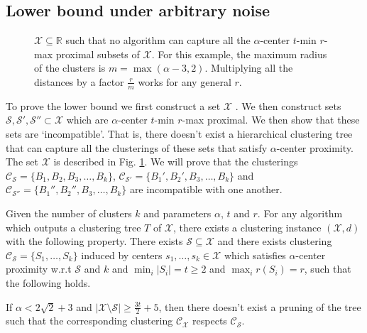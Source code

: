 \documentclass[anon,12pt]{colt2016} %
\newcommand{\mc}{\mathcal}
\begin{document}
\subsection{Lower bound under arbitrary noise}
\label{section:alphaLowerBoundArbitrary}

\begin{figure}

\caption{$\mc X \subseteq \mathbb{R}$ such that no algorithm can capture all the $\alpha$-center $t$-min $r$-max proximal subsets of $\mc X$. For this example, the maximum radius of the clusters is $m = \max(\alpha-3, 2)$. Multiplying all the distances by a factor $\frac{r}{m}$ works for any general $r$.} 
\label{fig:nosparsealg}
\end{figure}

To prove the lower bound we first construct a set $\mc X$ . We then construct sets $\mc S, \mc S', \mc S'' \subset \mc X$ which are $\alpha$-center $t$-min $r$-max proximal. We then show that these sets are `incompatible'. That is, there doesn't exist a  hierarchical clustering tree that can capture all the clusterings of these sets that satisfy $\alpha$-center proximity. The set $\mc X$ is described in Fig. \ref{fig:nosparsealg}. We will prove that the clusterings $\mc C_{\mc S} = \{B_1, B_2, B_3, \ldots, B_k\}$, $\mc C_{\mc S'} = \{B_1', B_2', B_3, \ldots, B_k\}$ and $\mc C_{\mc S''} = \{B_1'', B_2'', B_3, \ldots, B_k\}$ are incompatible with one another.

\begin{theorem}
\label{thm:nosparsealg}
Given the number of clusters $k$ and parameters $\alpha$, $t$ and $r$. For any algorithm which outputs a clustering tree $T$ of $\mc X$, there exists a clustering instance $(\mc X, d)$ with the following property. There exists $\mc S \subseteq \mc X$ and there exists clustering $\mc C_{\mc S} = \{S_1, \ldots, S_k\}$ induced by centers $s_1, \ldots, s_k \in \mc X$ which satisfies $\alpha$-center proximity w.r.t $\mc S$ and $k$ and $ \min_i|S_i| = t \ge 2$ and $\max_i r(S_i) = r$, such that the following holds. 

If $\alpha < 2\sqrt 2 + 3$ and $|\mc X \setminus \mc S| \ge \frac{3t}{2}+5$, then there doesn't exist a pruning of the tree such that the corresponding clustering $\mc C_{\mc X}$ respects $\mc C_{\mc S}$.
\end{theorem}
\end{document}
